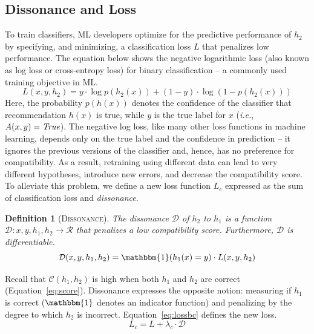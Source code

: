 \documentclass[letterpaper]{article}
\newtheorem*{definition}{Definition}
\newcommand{\hone}{\mbox{$h_1$}}
\newcommand{\htwo}{\mbox{$h_2$}}
\newcommand{\compatscore}{\mathcal{C}}
\newcommand{\loss}{L}
\newcommand{\lossbc}{\loss_c}
\newcommand{\lambdabc}{\lambda_c}
\newcommand{\dissonance}{\mathcal{D}}
\newcommand{\ie}{\mbox{\it i.e.}}
\begin{document}
\subsection{Dissonance and Loss}
To train classifiers, ML developers optimize for the predictive performance of $\htwo$
by specifying, and minimizing, a classification loss $\loss$ that penalizes low performance. The equation below shows the negative logarithmic loss (also known as log loss or cross-entropy loss) for binary classification -- a commonly used training objective in ML. 
\begin{equation*}
    \label{eq:logloss}
    \loss(x, y, \htwo) = y \cdot \log p(\htwo(x)) + (1 - y) \cdot \log (1 - p(\htwo(x)))
\end{equation*}
Here, the probability $p(h(x))$ denotes the confidence of the classifier that recommendation $h(x)$ is true, while $y$ is the true label for $x$ (\ie, $A(x, y) = \mbox{\em True}$).
The negative log loss, like many other loss functions in machine learning, depends only on the true label and the confidence in prediction -- it ignores the previous versions of the classifier and, hence, has no preference for compatibility. As a result, retraining using different data can lead to very different hypotheses, introduce new errors, and decrease the compatibility score. 
To alleviate this problem, we define a new loss function $\lossbc$ expressed as the sum of classification loss and {\em dissonance}.

\begin{definition}[\textsc{Dissonance}]
The dissonance $\dissonance$ of $\htwo$ to $\hone$ is a function $\dissonance: x, y, \hone, \htwo \rightarrow \mathcal{R}$ that penalizes a low compatibility score. Furthermore, $\dissonance$ is differentiable.
\begin{equation}
    \label{eq:diss}
    \dissonance(x, y, \hone, \htwo) = \mathbbm{1}(\hone(x) = y) \cdot \loss(x, y, \htwo)
\end{equation}
\end{definition}

\noindent Recall that  $\compatscore(\hone, \htwo)$ is high when both $\hone$ and $\htwo$ are correct (Equation~\ref{eq:score}).  Dissonance  expresses the opposite notion: measuring if $\hone$ is correct ($\mathbbm{1}$ denotes an indicator function)
and penalizing by the degree to which $\htwo$ is incorrect.
Equation~\ref{eq:lossbc} defines the new loss.
\begin{equation}
    \label{eq:lossbc}
    \lossbc = \loss + \lambdabc \cdot \dissonance
\end{equation}
\end{document}
